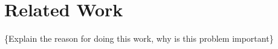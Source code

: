 
\section{Related Work}
\label{sec:related}

\{Explain the reason for doing this work, 
why is this problem important\}

